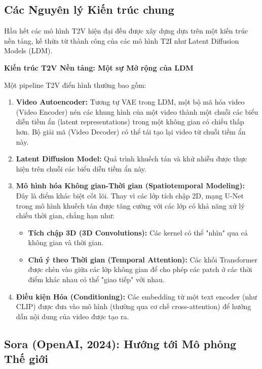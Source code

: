 \subsection{Các Nguyên lý Kiến trúc chung}
\label{subsec:t2v_architectural_principles}
Hầu hết các mô hình T2V hiện đại đều được xây dựng dựa trên một kiến trúc nền tảng, kế thừa từ thành công của các mô hình T2I như Latent Diffusion Models (LDM).
\begin{mdframed}[style=infobox]
	\textbf{Kiến trúc T2V Nền tảng: Một sự Mở rộng của LDM}
	
	Một pipeline T2V điển hình thường bao gồm:
	\begin{enumerate}
		\item \textbf{Video Autoencoder:} Tương tự VAE trong LDM, một bộ mã hóa video (Video Encoder) nén các khung hình của một video thành một chuỗi các biểu diễn tiềm ẩn (latent representations) trong một không gian có chiều thấp hơn. Bộ giải mã (Video Decoder) có thể tái tạo lại video từ chuỗi tiềm ẩn này.
		\item \textbf{Latent Diffusion Model:} Quá trình khuếch tán và khử nhiễu được thực hiện trên chuỗi các biểu diễn tiềm ẩn này.
		\item \textbf{Mô hình hóa Không gian-Thời gian (Spatiotemporal Modeling):} Đây là điểm khác biệt cốt lõi. Thay vì các lớp tích chập 2D, mạng U-Net trong mô hình khuếch tán được tăng cường với các lớp có khả năng xử lý chiều thời gian, chẳng hạn như:
		\begin{itemize}
			\item \textbf{Tích chập 3D (3D Convolutions):} Các kernel có thể "nhìn" qua cả không gian và thời gian.
			\item \textbf{Chú ý theo Thời gian (Temporal Attention):} Các khối Transformer được chèn vào giữa các lớp không gian để cho phép các patch ở các thời điểm khác nhau có thể "giao tiếp" với nhau.
		\end{itemize}
		\item \textbf{Điều kiện Hóa (Conditioning):} Các embedding từ một text encoder (như CLIP) được đưa vào mô hình (thường qua cơ chế cross-attention) để hướng dẫn nội dung của video được tạo ra.
	\end{enumerate}
\end{mdframed}

\subsection{Sora (OpenAI, 2024): Hướng tới Mô phỏng Thế giới}
\label{subsec:sora}

